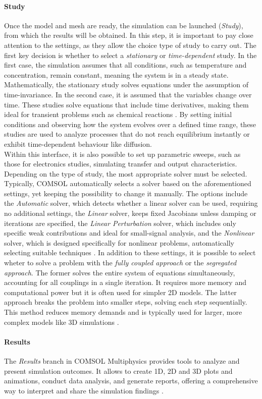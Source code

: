 \paragraph{Study}
Once the model and mesh are ready, the simulation can be launched (\emph{Study}), from which the results will be obtained. In this step, it is important to pay close attention to the settings, as they allow the choice type of study to carry out. The first key decision is whether to select a \emph{stationary} or \emph{time-dependent} study. In the first case, the simulation assumes that all conditions, such as temperature and concentration, remain constant, meaning the system is in a steady state. Mathematically, the stationary study solves equations under the assumption of time-invariance. In the second case, it is assumed that the variables change over time. These studies solve equations that include time derivatives, making them ideal for transient problems such as chemical reactions \citep{comsolCOMSOL_manual}. By setting initial conditions and observing how the system evolves over a defined time range, these studies are used to analyze processes that do not reach equilibrium instantly or exhibit time-dependent behaviour like diffusion.\\
%
Within this interface, it is also possible to set up parametric sweeps, such as those for electronics studies, simulating transfer and output characteristics. \\
%
Depending on the type of study, the most appropriate solver must be selected. Typically, COMSOL automatically selects a solver based on the aforementioned settings, yet keeping the possibility to change it manually. The options include the \emph{Automatic} solver, which detects whether a linear solver can be used, requiring no additional settings, the \emph{Linear} solver, keeps fixed Jacobians unless damping or iterations are specified, the \emph{Linear Perturbation} solver, which includes only specific weak contributions and ideal for small-signal analysis, and the \emph{Nonlinear} solver, which is designed specifically for nonlinear problems, automatically selecting suitable techniques \citep{comsolCOMSOL_manual}.
%
In addition to these settings, it is possible to select wheter to solve a problem with the \emph{fully coupled approach} or the \emph{segregated approach}. The former solves the entire system of equations simultaneously, accounting for all couplings in a single iteration. It requires more memory and computational power but it is often used for simpler 2D models. The latter approach breaks the problem into smaller steps, solving each step sequentially. This method reduces memory demands and is typically used for larger, more complex models like 3D simulations \citep{comsolCOMSOL_manual}.

\paragraph{Results}
The \emph{Results} branch in COMSOL Multiphysics provides tools to analyze and present simulation outcomes. It allows to create 1D, 2D and 3D plots and animations, conduct data analysis, and generate reports, offering a comprehensive way to interpret and share the simulation findings \citep{comsolCOMSOL_manual}.
